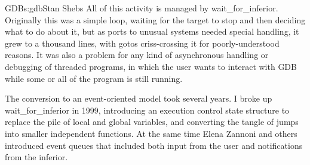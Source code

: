 \begin{aosachapter}{GDB}{s:gdb}{Stan Shebs}
All of this activity is managed by wait_for_inferior.  Originally this
was a simple loop, waiting for the target to stop and then deciding
what to do about it, but as ports to unusual systems needed special
handling, it grew to a thousand lines, with gotos criss-crossing it
for poorly-understood reasons.  It was also a problem for any kind of
asynchronous handling or debugging of threaded programs, in which the
user wants to interact with GDB while some or all of the program is
still running.

The conversion to an event-oriented model took several years.  I broke
up wait_for_inferior in 1999, introducing an execution control state
structure to replace the pile of local and global variables, and
converting the tangle of jumps into smaller independent functions.  At
the same time Elena Zannoni and others introduced event queues that
included both input from the user and notifications from the inferior.

\end{aosachapter}
